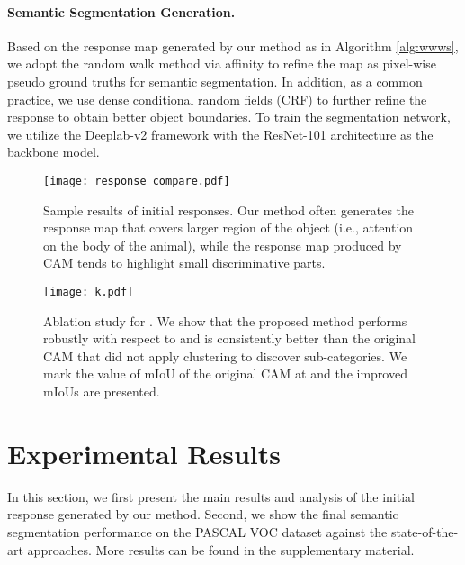 \documentclass[10pt,twocolumn,letterpaper]{article}
\begin{document}
\paragraph{Semantic Segmentation Generation.}
Based on the response map generated by our method as in Algorithm \ref{alg:wwws}, we adopt the random walk method via affinity \cite{ahn2018learning} to refine the map as pixel-wise pseudo ground truths for semantic segmentation.
In addition, as a common practice, we use dense conditional random fields (CRF) \cite{crf} to further refine the response to obtain better object boundaries.
To train the segmentation network, we utilize the Deeplab-v2 framework \cite{deeplab} with the ResNet-101 architecture \cite{He_2016_CVPR} as the backbone model.







\begin{figure*}[t]
	\centering
	\texttt{[image: response\_compare.pdf]}\\
\caption{Sample results of initial responses. 
Our method often generates the response map that covers larger region of the object (i.e., attention on the body of the animal), while the response map produced by CAM \cite{zhou2016learning} tends to highlight small discriminative parts.}
	\label{fig: cam_viz}
	\vspace{-1mm}
\end{figure*}


\begin{figure}[!t]
	\centering
	\texttt{[image: k.pdf]}\\
	\vspace{-1mm}
	\caption{Ablation study for . We show that the proposed method performs robustly with respect to  and is consistently better than the original CAM that did not apply clustering to discover sub-categories. We mark the value of mIoU of the original CAM at  and the improved mIoUs are presented.}
	\label{fig: k}
	\vspace{-3mm}
\end{figure}



\section{Experimental Results}
In this section, we first present the main results and analysis of the initial response generated by our method.
Second, we show the final semantic segmentation performance on the PASCAL VOC dataset \cite{PASCAL_VOC_2010_Data} against the state-of-the-art approaches.
More results can be found in the supplementary material. 
\end{document}
